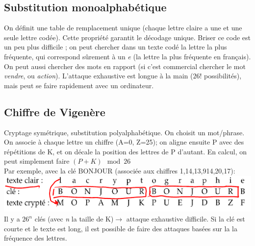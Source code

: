 \documentclass[11pt,a4paper]{article}
\begin{document}
\subsection{Substitution monoalphabétique}
On définit une table de remplacement unique (chaque lettre claire a une et une seule lettre codée). Cette propriété garantit le décodage unique. Briser ce code est un peu plus difficile ; on peut chercher dans un texte codé la lettre la plus fréquente, qui correspond sûrement à un \textit{e} (la lettre la plus fréquente en français). On peut aussi chercher des mots en rapport (si c'est commercial chercher le mot \textit{vendre}, ou \textit{action}). L'attaque exhaustive est longue à la main ($26!$ possibilités), mais peut se faire rapidement avec un ordinateur.
\subsection{Chiffre de Vigenère}
Cryptage symétrique, substitution polyalphabétique. On choisit un mot/phrase. On associe à chaque lettre un chiffre (A=0, Z=25); on aligne ensuite P avec des répétitions de K, et on décale la position des lettres de P d'autant. En calcul, on peut simplement faire $(P+K)\mod 26$ \\
Par exemple, avec la clé BONJOUR (associée aux chiffres 1,14,13,914,20,17): \\
\includegraphics[scale=0.7]{images/vigenere}\\
Il y a $26^n$ clés (avec \textit{n} la taille de K)$\to$ attaque exhaustive difficile. Si la clé est courte et le texte est long, il est possible de faire des attaques basées sur la la fréquence des lettres.
\end{document}
